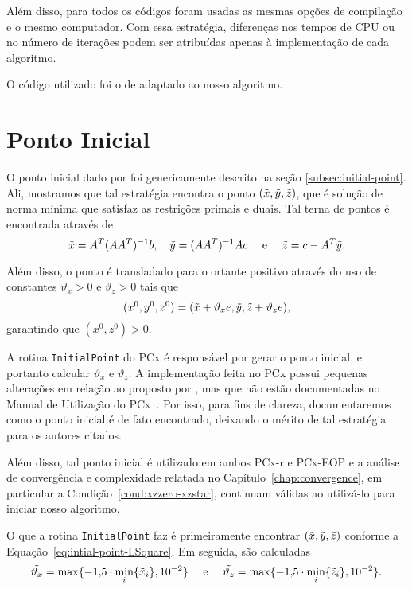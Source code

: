 Além disso, para todos os códigos foram usadas as mesmas opções de compilação e o mesmo computador. Com essa estratégia, diferenças nos tempos de CPU ou no número de iterações podem ser atribuídas apenas à implementação de cada algoritmo. 

O código utilizado foi o de \textcite{VillasBoas:2012ur,VillasBoas2013:wn} adaptado ao nosso algoritmo. 




\section{Ponto Inicial}
\label{sec:initial:point}
O ponto inicial dado por \textcite{Mehrotra:1992wr} foi genericamente descrito na seção \ref{subsec:initial-point}. Ali, mostramos que tal estratégia encontra o ponto $(\tilde{x},\tilde{y},\tilde{z})$, que é solução de norma mínima que satisfaz as restrições primais e
duais. Tal terna de pontos é encontrada através de
\begin{equation}
	\label{eq:intial-point-LSquare}
	\tilde{x} = A^T(AA^T)^{-1}b, \quad \tilde{y} = (AA^T)^{-1}Ac\quad \text{ e }
\quad \tilde{z} = c - A^T\tilde{y}.
\end{equation}

Além disso, o ponto é transladado para o ortante positivo 
através do uso de constantes  $\vartheta_x>0$ e $\vartheta_ z>0$ tais que  
\begin{equation}
	\label{eq:intial-point-generated}
(x^0,y^0,z^0) = (\tilde{x}+ \vartheta_x e,\tilde{y},\tilde{z}+\vartheta_z e),
\end{equation}
garantindo que $(x^0,z^0)>0$.


 A rotina \verb|InitialPoint| do PCx é responsável por gerar o ponto inicial, e portanto calcular  $\vartheta_x$ e $\vartheta_ z$. A implementação feita no PCx possui  pequenas alterações em relação ao proposto por \citeauthor{Mehrotra:1992wr}, mas que não  estão documentadas no Manual de Utilização do PCx~\cite{Czyzyk:1998vw}. Por isso, para fins de clareza, documentaremos como o ponto inicial é de fato encontrado, deixando o mérito de tal estratégia para os autores citados.

  Além disso, tal ponto inicial é utilizado em ambos PCx-r e PCx-EOP e a análise de convergência e complexidade relatada no Capítulo~\ref{chap:convergence}, em particular a Condição~\ref{cond:xzzero-xzstar}, continuam válidas ao utilizá-lo para iniciar nosso algoritmo.

O que a rotina  \verb|InitialPoint| faz é primeiramente encontrar  $(\tilde{x},\tilde{y},\tilde{z})$ conforme a Equação~\eqref{eq:intial-point-LSquare}. Em seguida,  são calculadas
\begin{equation}
	\label{eq:initial-point-tilde-var}
\tilde{\vartheta_x} = \max\{\displaystyle\num{-1.5}\cdot\min_{i}\{\tilde{x}_{i}\},\num{e-2}\} \quad \text{ e }\quad  \tilde{\vartheta_z} = \max\{\displaystyle\num{-1.5}\cdot\min_{i}\{\tilde{z}_{i}\},\num{e-2}\}.
\end{equation}

